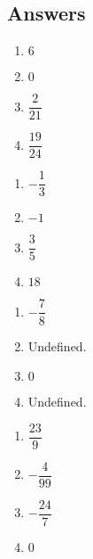 \documentclass{ximera}
\begin{document}
\newpage

\subsection{Answers}

\begin{multicols}{4}
\begin{enumerate}

\item $6$
\item $0$
\item  $\dfrac{2}{21}$
\item  $\dfrac{19}{24}$

\setcounter{HW}{\value{enumi}}
\end{enumerate}
\end{multicols}

\begin{multicols}{4}
\begin{enumerate}
\setcounter{enumi}{\value{HW}}

\item  $-\dfrac{1}{3}$
\item  $-1$
\item  $\dfrac{3}{5}$
\item  $18$

\setcounter{HW}{\value{enumi}}
\end{enumerate}
\end{multicols}

\begin{multicols}{4}
\begin{enumerate}
\setcounter{enumi}{\value{HW}}

\item  $-\dfrac{7}{8}$
\item  Undefined.
\item  $0$
\item  Undefined.

\setcounter{HW}{\value{enumi}}
\end{enumerate}
\end{multicols}



\begin{multicols}{4}
\begin{enumerate}
\setcounter{enumi}{\value{HW}}

\item  $\dfrac{23}{9}$
\item  $-\dfrac{4}{99}$
\item  $-\dfrac{24}{7}$
\item  $0$

\setcounter{HW}{\value{enumi}}
\end{enumerate}
\end{multicols}
\end{document}
